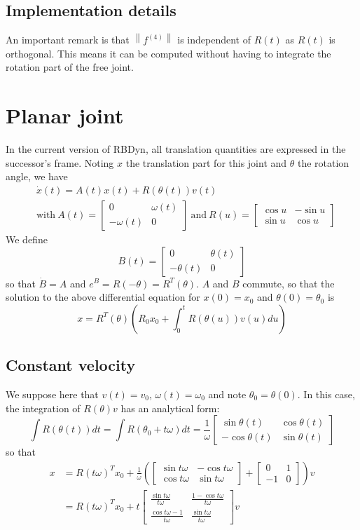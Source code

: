 \documentclass[]{article}
\newcommand{\BIN}{\begin{bmatrix}}
\newcommand{\BOUT}{\end{bmatrix}}
\newcommand{\norm}[1]{\left\| #1 \right\|}
\newcommand{\w}{\omega}
\begin{document}
\subsection{Implementation details}
An important remark is that $\norm{f^{(4)}}$ is independent of $R(t)$ as $R(t)$ is orthogonal. This means it can be computed without having to integrate the rotation part of the free joint.
\newline



\section{Planar joint}
In the current version of RBDyn, all translation quantities are expressed in the successor's frame. Noting $x$ the translation part for this joint and $\theta$ the rotation angle, we have
\begin{align}
&\dot{x}(t) = A(t) x(t) + R(\theta(t)) v(t)\\
&\mbox{with}\ A(t) = \BIN 0 & \w(t) \\ -\w(t) & 0 \BOUT \ \mbox{and}\ R(u) = \BIN \cos{u} & -\sin{u} \\ \sin{u} & \cos{u}\BOUT \nonumber
\end{align}
We define
\begin{equation}
	B(t) = \BIN 0 & \theta(t) \\ -\theta(t) & 0 \BOUT
\end{equation}
so that $\dot{B} = A$ and $e^B = R(-\theta) = R^T(\theta)$. $A$ and $B$ commute, so that the solution to the above differential equation for $x(0) = x_0$ and $\theta(0) = \theta_0$ is
\begin{equation}
	x = R^T(\theta)\left(R_0 x_0 + \int_0^t R(\theta(u))v(u) du \right) \label{eq:planarSol}
\end{equation}


\subsection{Constant velocity}
We suppose here that $v(t) = v_0$, $\w(t) = \w_0$ and note $\theta_0 = \theta(0)$.\newline
In this case, the integration of $R(\theta)v$ has an analytical form:
\begin{equation}
	\int R(\theta(t)) dt = \int R(\theta_0+ t \w) dt = \frac{1}{\w} \BIN \sin{\theta(t)} & \cos{\theta(t)} \\ -\cos{\theta(t)} & \sin{\theta(t)} \BOUT
\end{equation}
so that
\begin{align}
	x & = R(t\w)^T x_0 + \frac{1}{\w}\left( \BIN \sin{t \w} &-\cos{t \w} \\ \cos{t \w} & \sin{t \w} \BOUT + \BIN 0 & 1 \\ -1 & 0 \BOUT \right) v \\
	  & = R(t\w)^T x_0 + t \BIN \frac{\sin{t \w}}{t \w} & \frac{1-\cos{t \w}}{t \w} \\ \frac{\cos{t \w}-1}{t \w} & \frac{\sin{t \w}}{t \w} \BOUT v
\end{align}
\end{document}
